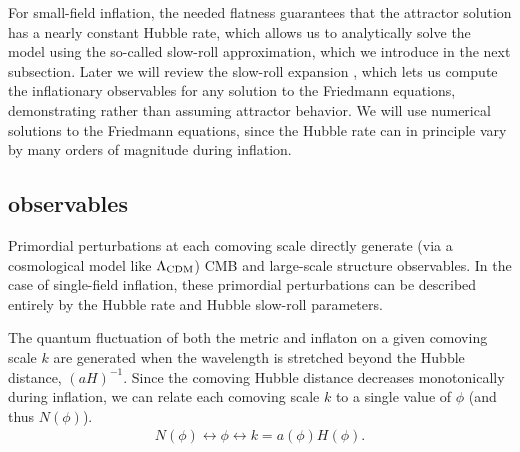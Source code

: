 \documentclass[aps,amsfonts,amsmath,prd,preprint,nofootinbib,superscriptaddress]{revtex4}
\begin{document}
\begin{appendix}
For small-field inflation, the needed flatness guarantees that the attractor solution has a nearly constant Hubble rate, which allows us to 
analytically solve the model using the so-called slow-roll approximation, which we introduce in the next subsection.  
Later we will review the slow-roll expansion \cite{Liddle:1994dx}, which lets us compute the inflationary observables for any solution to the Friedmann equations, 
demonstrating rather than assuming attractor behavior.  
We will use numerical solutions to the Friedmann equations, since the Hubble rate can in principle vary by many orders of magnitude during inflation.









\subsection{observables}
Primordial perturbations at each comoving scale directly 
generate (via a cosmological model like $\Lambda_{\rm CDM}$) CMB and large-scale structure observables.   In the case of single-field inflation, these primordial perturbations can 
be described entirely by the Hubble rate and Hubble slow-roll parameters.

The quantum fluctuation of both the metric and inflaton on a given comoving scale $k$ are generated when the wavelength is stretched beyond the Hubble distance, $(a H)^{-1}$.
Since the comoving Hubble distance decreases monotonically during inflation, we can relate each comoving scale $k$ to a single value of $\phi$ (and thus $N(\phi)$). 
\begin{align}
N(\phi) \longleftrightarrow \phi \longleftrightarrow k = a(\phi) H(\phi).
\end{align}  



 


\end{appendix}
\end{document}
